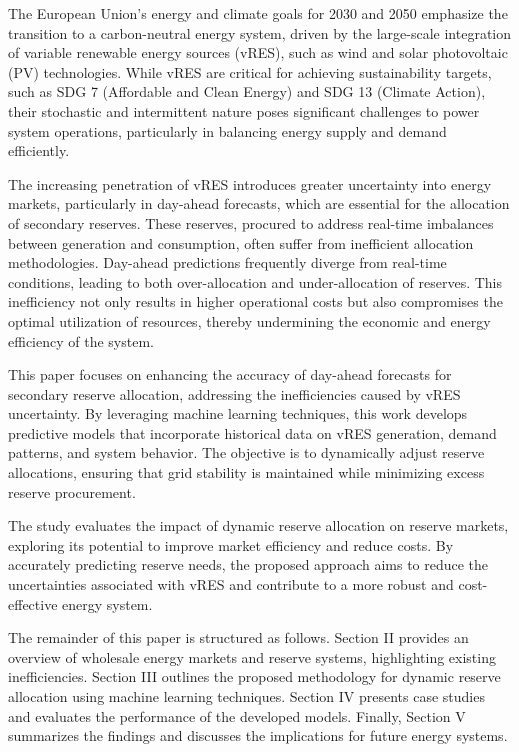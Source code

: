 

The European Union's energy and climate goals for 2030 and 2050 emphasize the transition to a carbon-neutral energy system, driven by the large-scale integration of variable renewable energy sources (vRES), such as wind and solar photovoltaic (PV) technologies. While vRES are critical for achieving sustainability targets, such as SDG 7 (Affordable and Clean Energy) and SDG 13 (Climate Action), their stochastic and intermittent nature poses significant challenges to power system operations, particularly in balancing energy supply and demand efficiently. \par
The increasing penetration of vRES introduces greater uncertainty into energy markets, particularly in day-ahead forecasts, which are essential for the allocation of secondary reserves. These reserves, procured to address real-time imbalances between generation and consumption, often suffer from inefficient allocation methodologies. Day-ahead predictions frequently diverge from real-time conditions, leading to both over-allocation and under-allocation of reserves. This inefficiency not only results in higher operational costs but also compromises the optimal utilization of resources, thereby undermining the economic and energy efficiency of the system.\par
This paper focuses on enhancing the accuracy of day-ahead forecasts for secondary reserve allocation, addressing the inefficiencies caused by vRES uncertainty. By leveraging machine learning techniques, this work develops predictive models that incorporate historical data on vRES generation, demand patterns, and system behavior. The objective is to dynamically adjust reserve allocations, ensuring that grid stability is maintained while minimizing excess reserve procurement.\par
The study evaluates the impact of dynamic reserve allocation on reserve markets, exploring its potential to improve market efficiency and reduce costs. By accurately predicting reserve needs, the proposed approach aims to reduce the uncertainties associated with vRES and contribute to a more robust and cost-effective energy system.\par
The remainder of this paper is structured as follows. Section II provides an overview of wholesale energy markets and reserve systems, highlighting existing inefficiencies. Section III outlines the proposed methodology for dynamic reserve allocation using machine learning techniques. Section IV presents case studies and evaluates the performance of the developed models. Finally, Section V summarizes the findings and discusses the implications for future energy systems.\par

